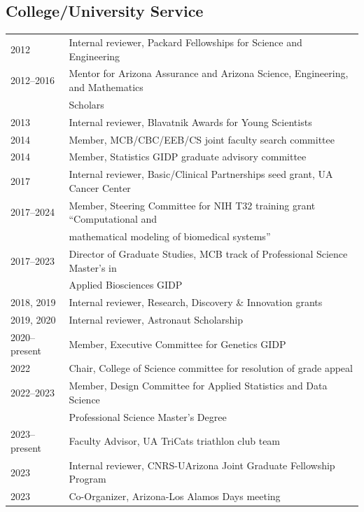 \documentclass[11pt]{article}
\begin{document}
\subsection*{College/University Service}
\begin{longtable}[l]{l l}
2012 & Internal reviewer, Packard Fellowships for Science and Engineering\\
2012--2016 & Mentor for Arizona Assurance and Arizona Science, Engineering, and Mathematics\\
                        & Scholars\\
2013 & Internal reviewer, Blavatnik Awards for Young Scientists\\
2014 & Member, MCB/CBC/EEB/CS joint faculty search committee\\
2014 & Member, Statistics GIDP graduate advisory committee\\
2017 & Internal reviewer, Basic/Clinical Partnerships seed grant, UA Cancer Center\\
2017--2024 & Member, Steering Committee for NIH T32 training grant ``Computational and\\
&mathematical modeling of biomedical systems''\\
2017--2023 & Director of Graduate Studies, MCB track of Professional Science Master's in \\
& Applied Biosciences GIDP\\
2018, 2019 & Internal reviewer, Research, Discovery \& Innovation grants\\%
2019, 2020 & Internal reviewer, Astronaut Scholarship\\
2020--present & Member, Executive Committee for Genetics GIDP\\
2022 & Chair, College of Science committee for resolution of grade appeal\\
2022--2023& Member, Design Committee for Applied Statistics and Data Science\\ & Professional Science Master's Degree\\
2023--present & Faculty Advisor, UA TriCats triathlon club team\\
2023 & Internal reviewer, CNRS-UArizona Joint Graduate Fellowship Program\\
2023 & Co-Organizer, Arizona-Los Alamos Days meeting\\

\end{longtable}
\end{document}
